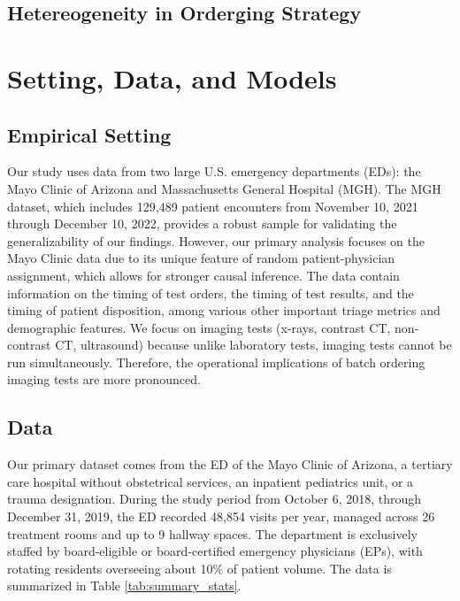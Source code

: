 \documentclass[,mnsc,nonblindrev]{informs}
\begin{document}
\hypertarget{hetereogeneity-in-orderging-strategy}{%
\subsection{Hetereogeneity in Orderging
Strategy}\label{hetereogeneity-in-orderging-strategy}}

\hypertarget{setting-data-and-models}{%
\section{Setting, Data, and Models}\label{setting-data-and-models}}

\hypertarget{empirical-setting}{%
\subsection{Empirical Setting}\label{empirical-setting}}

Our study uses data from two large U.S. emergency departments (EDs): the
Mayo Clinic of Arizona and Massachusetts General Hospital (MGH). The MGH
dataset, which includes 129,489 patient encounters from November 10,
2021 through December 10, 2022, provides a robust sample for validating
the generalizability of our findings. However, our primary analysis
focuses on the Mayo Clinic data due to its unique feature of random
patient-physician assignment, which allows for stronger causal
inference. The data contain information on the timing of test orders,
the timing of test results, and the timing of patient disposition, among
various other important triage metrics and demographic features. We
focus on imaging tests (x-rays, contrast CT, non-contrast CT,
ultrasound) because unlike laboratory tests, imaging tests cannot be run
simultaneously. Therefore, the operational implications of batch
ordering imaging tests are more pronounced.

\hypertarget{data}{%
\subsection{Data}\label{data}}

Our primary dataset comes from the ED of the Mayo Clinic of Arizona, a
tertiary care hospital without obstetrical services, an inpatient
pediatrics unit, or a trauma designation. During the study period from
October 6, 2018, through December 31, 2019, the ED recorded 48,854
visits per year, managed across 26 treatment rooms and up to 9 hallway
spaces. The department is exclusively staffed by board-eligible or
board-certified emergency physicians (EPs), with rotating residents
overseeing about 10\% of patient volume. The data is summarized in Table
\ref{tab:summary_stats}.
\end{document}
